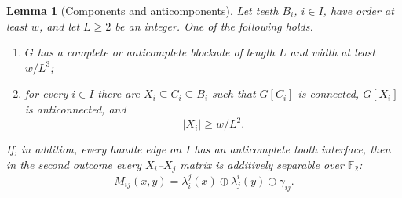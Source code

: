 \documentclass[11pt]{article}
\numberwithin{equation}{section}
\theoremstyle{plain}
\newtheorem{lemma}[theorem]{Lemma}
\theoremstyle{definition}
\begin{document}
\begin{lemma}[Components and anticomponents]
\label{lem:pivot-carriers}
Let teeth $B_i$, $i\in I$, have order at least $w$, and let $L\geq2$
be an integer.
One of the following holds.
\begin{enumerate}
 \item $G$ has a complete or anticomplete blockade of length $L$ and
       width at least $w/L^3$;
 \item for every $i\in I$ there are
       $X_i\subseteq C_i\subseteq B_i$ such that $G[C_i]$ is connected,
       $G[X_i]$ is anticonnected, and
       \[
                         |X_i|\geq w/L^2.
       \]
\end{enumerate}
If, in addition, every handle edge on $I$ has an anticomplete tooth
interface, then in the second outcome every $X_i$--$X_j$ matrix is additively separable over $\mathbb F_2$:
\begin{equation}
 M_{ij}(x,y)=\lambda_i^j(x)\oplus\lambda_j^i(y)
                                      \oplus\gamma_{ij}.
 \label{eq:pivot-carrier-affine}
\end{equation}
\end{lemma}
\end{document}
